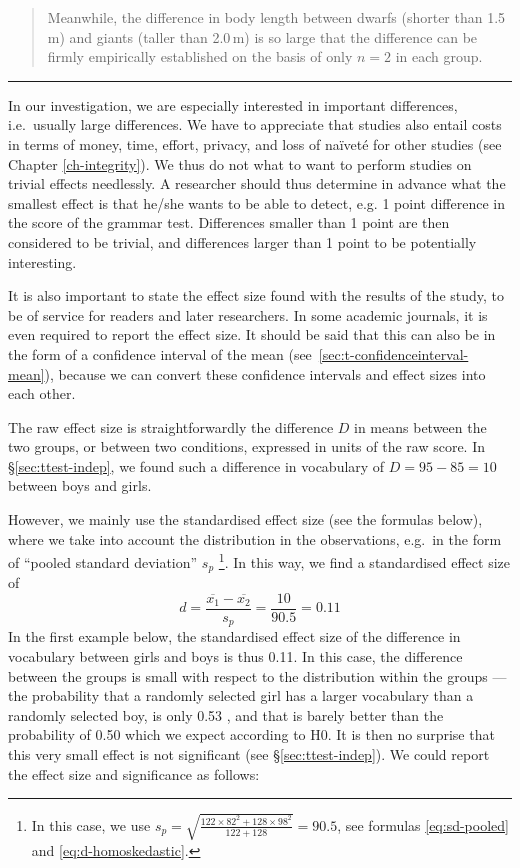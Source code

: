 \documentclass[
]{book}
\begin{document}
\begin{quote}
Meanwhile, the difference in body length between dwarfs (shorter than
1.5 m) and giants (taller than 2.0 m) is so large that the difference can be firmly
empirically established on the basis of only \(n=2\) in each group.
\end{quote}

\begin{center}\rule{0.5\linewidth}{0.5pt}\end{center}

In our investigation, we are especially interested in important
differences, i.e.~usually large differences. We have to appreciate
that studies also entail costs in terms of money, time,
effort, privacy, and loss of naïveté for other studies
(see Chapter
\ref{ch-integrity}). We thus do not what to want to perform studies
on trivial effects needlessly. A researcher should thus determine in advance
what the smallest effect is that he/she wants to be able to detect, e.g.
1 point difference in the score of the grammar test. Differences smaller than
1 point are then considered to be trivial, and differences larger than 1 point to be potentially
interesting.

It is also important to state the effect size found with the results
of the study, to be of service for readers and later
researchers. In some academic journals, it is even
required to report the effect size. It should be said that this
can also be in the form of a confidence interval of the mean
(see~\ref{sec:t-confidenceinterval-mean}), because we can
convert these confidence intervals and effect sizes into
each other.

The raw effect size is straightforwardly the difference \(D\) in means
between the two groups, or between two conditions, expressed in units
of the raw score. In §\ref{sec:ttest-indep}, we found such a difference
in vocabulary of \(D=95-85=10\) between boys and girls.

However, we mainly use the standardised effect size (see
the formulas below), where we take into account the distribution in
the observations, e.g.~in the form of ``pooled standard deviation'' \(s_p\) \footnote{In this case, we use \(s_p = \sqrt{ \frac{122\times82^2+128\times98^2} {122+128} } = 90.5\), see formulas
  \eqref{eq:sd-pooled} and \eqref{eq:d-homoskedastic}.}.
In this way, we find a standardised effect size of
\begin{equation}
  \label{eq:d-standardized}
    d = \frac{ \overline{x_1}-\overline{x_2} } {s_p} = \frac{10}{90.5} = 0.11
\end{equation}
In the first example below, the standardised effect size of the difference in
vocabulary between girls and boys is thus 0.11. In this case, the difference
between the groups is small with respect to the distribution
within the groups --- the probability that a randomly selected girl
has a larger vocabulary than a randomly selected boy, is only 0.53 \citep{McGraw92},
and that is barely better than the probability of 0.50 which we expect according to H0.
It is then no surprise that this very small effect is not significant
(see §\ref{sec:ttest-indep}). We could
report the effect size and significance as follows:
\end{document}
